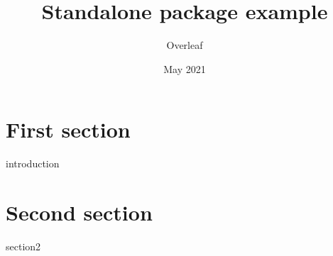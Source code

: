\documentclass{article}
\title{Standalone package example}
\author{Overleaf}
\date{May 2021}
\begin{document}
\maketitle

\section{First section}
{introduction}

\section{Second section}
{section2}
\end{document}
